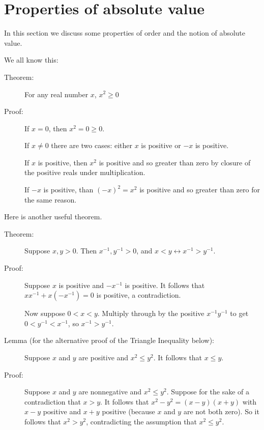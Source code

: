 \documentclass[12pt]{article}
\begin{document}
\newpage

\section{Properties of absolute value}

In this section we discuss some properties of order and the notion of absolute value.

We all know this:

\begin{description}

\item[Theorem:]  For any real number $x$, $x^2\geq 0$

\item[Proof:]  If $x=0$, then $x^2=0 \geq 0$.

If $x \neq 0$ there are two cases:  either $x$ is positive or $-x$ is positive.

If $x$ is positive, then $x^2$ is positive and so greater than zero by closure of the positive reals under multiplication.

If $-x$ is positive, than $(-x)^2 = x^2$ is positive and so greater than zero for the same reason.

\end{description}

Here is another useful theorem.

\begin{description}

\item[Theorem:]  Suppose $x,y >0$.  Then $x^{-1}, y^{-1}>0$, and $x < y \leftrightarrow x^{-1}>y^{-1}$.

\item[Proof:]  Suppose $x$ is positive and $-x^{-1}$ is positive.  It follows that $xx^{-1} + x(-x^{-1}) = 0$ is positive, a contradiction.

Now suppose $0<x<y$.  Multiply through by the positive $x^{-1}y^{-1}$ to get $0<y^{-1}<x^{-1}$, so $x^{-1}>y^{-1}$.

\item[Lemma (for the alternative proof of the Triangle Inequality below):]  Suppose $x$ and $y$ are positive
and $x^2\leq y^2$.  It follows that $x \leq y$.

\item[Proof:]  Suppose $x$ and $y$ are nonnegative
and $x^2\leq y^2$.  Suppose for the sake of a contradiction that $x>y$.  It follows that $x^2 - y^2 = (x-y)(x+y)$ with $x-y$ positive and $x+y$ positive (because $x$ and $y$ are not both zero).  So it follows that $x^2>y^2$, contradicting the assumption that $x^2 \leq y^2$.

\end{description}
\end{document}
